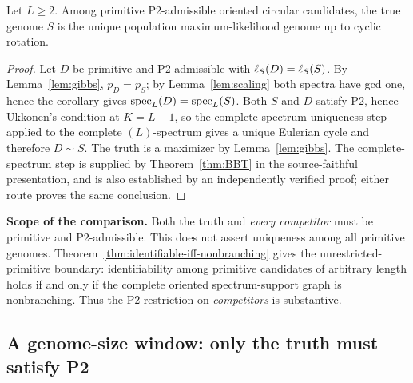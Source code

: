 \begin{theorem}
\label{thm:population}
Let $L\ge2$. Among primitive P2-admissible oriented circular candidates, the
true genome $S$ is the unique population maximum-likelihood genome up to cyclic
rotation.
\end{theorem}

\begin{proof}
Let $D$ be primitive and P2-admissible with $\ell_S(D)=\ell_S(S)$. By
Lemma~\ref{lem:gibbs}, $p_D=p_S$; by Lemma~\ref{lem:scaling} both spectra
have gcd one, hence the corollary gives
$\operatorname{spec}_L(D)=\operatorname{spec}_L(S)$. Both $S$ and $D$ satisfy P2, hence Ukkonen's condition
at $K=L-1$, so the complete-spectrum uniqueness step applied to the complete
$(L)$-spectrum gives a unique Eulerian cycle and therefore $D\sim S$. The truth
is a maximizer by Lemma~\ref{lem:gibbs}. The complete-spectrum step is
supplied by Theorem~\ref{thm:BBT} in the source-faithful presentation, and is
also established by an independently verified proof; either route
proves the same conclusion.
\end{proof}

\noindent\textbf{Scope of the comparison.}
Both the truth and \emph{every competitor} must be primitive and
P2-admissible. This does not assert uniqueness among all primitive
genomes. Theorem~\ref{thm:identifiable-iff-nonbranching}
gives the unrestricted-primitive boundary: identifiability among
primitive candidates of arbitrary length holds if and only if
the complete oriented spectrum-support graph is nonbranching.
Thus the P2 restriction on \emph{competitors} is substantive.






\subsection{A genome-size window: only the truth must satisfy P2}
\label{sec:population:length-window}

